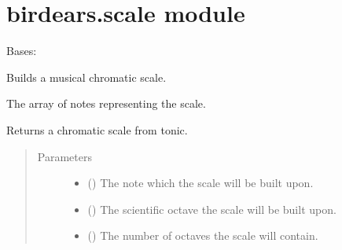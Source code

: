 \documentclass[letterpaper,10pt,english]{sphinxmanual}
\begin{document}
\section{birdears.scale module}
\label{\detokenize{index:birdears-scale-module}}\label{\detokenize{index:module-birdears.scale}}

\begin{fulllineitems}
\label{\detokenize{index:birdears.scale.ChromaticScale}}
Bases: {\hyperref[\detokenize{index:birdears.scale.ScaleBase}]{}}

Builds a musical chromatic scale.

\begin{fulllineitems}
\label{\detokenize{index:birdears.scale.ChromaticScale.scale}}
 \textendash{} The array of notes representing the scale.

\end{fulllineitems}


\begin{fulllineitems}
\label{\detokenize{index:birdears.scale.ChromaticScale.__init__}}
Returns a chromatic scale from tonic.
\begin{quote}\begin{description}
\item[{Parameters}] \leavevmode\begin{itemize}
\item {} 
 () \textendash{} The note which the scale will be built upon.

\item {} 
 () \textendash{} The scientific octave the scale will be built upon.

\item {} 
 () \textendash{} The number of octaves the scale will contain.


\end{itemize}
\end{description}
\end{quote}
\end{fulllineitems}
\end{fulllineitems}
\end{document}
